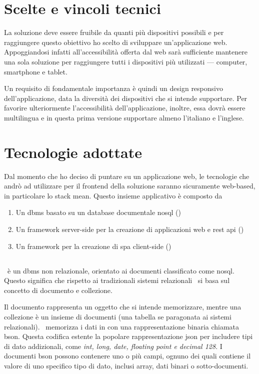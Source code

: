 \section{Scelte e vincoli tecnici} 

La soluzione deve essere fruibile da quanti più dispositivi possibili e per raggiungere questo obiettivo ho scelto di sviluppare un'applicazione web. Appoggiandosi infatti all'accessibilità offerta dal web sarà sufficiente mantenere una sola soluzione per raggiungere tutti i dispositivi più utilizzati --- computer, smartphone e tablet.

Un requisito di fondamentale importanza è quindi un design responsivo dell'applicazione, data la diversità dei dispositivi che si intende supportare. 
Per favorire ulteriormente l'accessibilità dell'applicazione, inoltre, essa dovrà essere multilingua e in questa prima versione supportare almeno l'italiano e l'inglese.

\section{Tecnologie adottate}
Dal momento che ho deciso di puntare su un applicazione web, le tecnologie che andrò ad utilizzare per il \gls{frontend} della soluzione saranno sicuramente web-based, in particolare lo stack \gls{mean}. Questo insieme applicativo è composto da
\begin{enumerate}
	\item Un \acrshort{dbms} basato su un database documentale \acrshort{nosql} (\mongodb)
	\item Un \gls{framework} server-side per la creazione di applicazioni web e \acrshort{rest} \acrshort{api} (\expressjs)
	\item Un \gls{framework} per la creazione di \acrshort{spa} client-side (\angular)
\end{enumerate}


\subsection{\mongodb}

\mongodb~è un \gls{dbms} non relazionale, orientato ai documenti classificato come \gls{nosql}. Questo significa che rispetto ai tradizionali sistemi relazionali \mongodb~si basa sul concetto di documento e collezione.

Il documento rappresenta un oggetto che si intende memorizzare, mentre una collezione è un insieme di documenti (una tabella se paragonata ai sistemi relazionali).
\mongodb~memorizza i dati in con una rappresentazione binaria chiamata \gls{bson}. Questa codifica estente la popolare rappresentazione \gls{json} per includere tipi di dato addizionali, come \textit{int, long, date, floating point e decimal 128}. I documenti \acrshort{bson} possono contenere uno o più campi, ognuno dei quali contiene il valore di uno specifico tipo di dato, inclusi array, dati binari o sotto-documenti.

